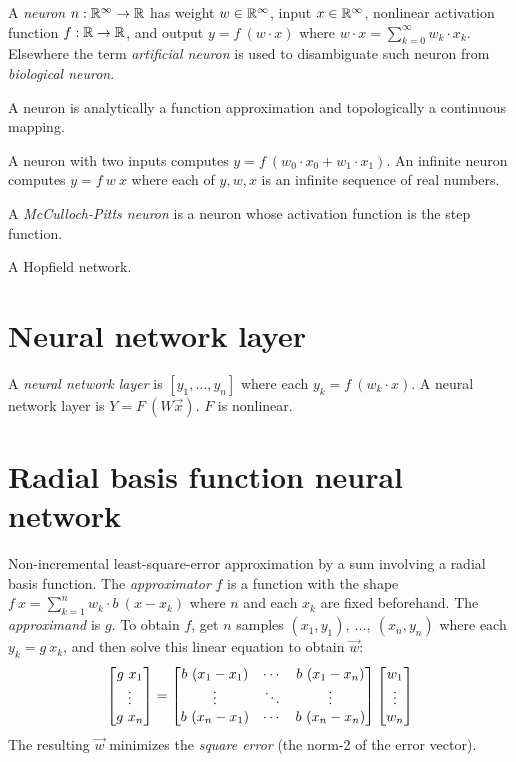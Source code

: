 A \emph{neuron} \(n : \mathbb{R}^\infty \to \mathbb{R}\)
has weight \(w \in \mathbb{R}^\infty\), input \(x \in \mathbb{R}^\infty\),
nonlinear activation function \(f : \mathbb{R} \to \mathbb{R}\),
and output \(y = f~(w \cdot x)\) where \(w \cdot x = \sum_{k=0}^\infty w_k \cdot x_k\).
Elsewhere the term \emph{artificial neuron} is used to disambiguate
such neuron from \emph{biological neuron}.

A neuron is analytically a function approximation
and topologically a continuous mapping.

A neuron with two inputs computes \(y = f~(w_0 \cdot x_0 + w_1 \cdot x_1)\).
An infinite neuron computes \(y = f~w~x\)
where each of \(y,w,x\) is an infinite sequence of real numbers.

%
%
A \emph{McCulloch-Pitts neuron} is a neuron whose activation function is the step function.

A Hopfield network.

\section{Neural network layer}

A \emph{neural network layer} is
\([y_1,\ldots,y_n]\) where each \(y_k = f~(w_k \cdot x) \).
A neural network layer is
\(Y = F~(W \vec{x}) \).
\(F\) is nonlinear.

\section{Radial basis function neural network}

Non-incremental least-square-error approximation by a sum involving a radial basis function.
The \emph{approximator} \(f\) is a function with the shape \(f~x = \sum_{k=1}^n w_k \cdot b~(x-x_k)\)
where \(n\) and each \(x_k\) are fixed beforehand.
The \emph{approximand} is \(g\).
To obtain \(f\),
get \(n\) samples \((x_1,y_1), ~ \ldots , ~ (x_n,y_n)\) where each \(y_k = g~x_k\),
and then
solve this linear equation to obtain \(\vec{w}\):
\begin{align}
    \begin{bmatrix}g~x_1 \\ \vdots \\ g~x_n\end{bmatrix} = \begin{bmatrix}b~(x_1-x_1) & \cdots & b~(x_1-x_n) \\ \vdots & \ddots & \vdots \\ b~(x_n-x_1) & \cdots & b~(x_n-x_n)\end{bmatrix} \begin{bmatrix}w_1 \\ \vdots \\ w_n\end{bmatrix}
\end{align}
The resulting \(\vec{w}\) minimizes the
\emph{square error} (the norm-2 of the error vector).


